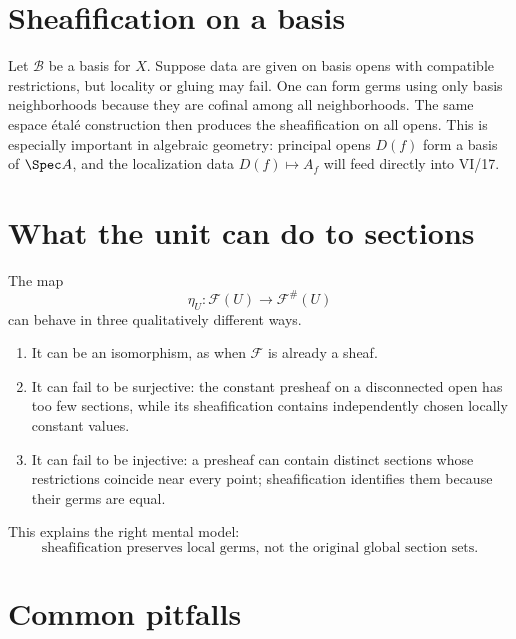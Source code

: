 

\section{Sheafification on a basis}

Let $\mathcal B$ be a basis for $X$.  Suppose data are given on basis opens with compatible
restrictions, but locality or gluing may fail.  One can form germs using only basis
neighborhoods because they are cofinal among all neighborhoods.  The same espace
\'{e}tal\'{e} construction then produces the sheafification on all opens.  This is especially
important in algebraic geometry: principal opens $D(f)$ form a basis of $\Spec A$, and the
localization data $D(f)\mapsto A_f$ will feed directly into VI/17.

\section{What the unit can do to sections}

The map
\[
\eta_U:\mathcal F(U)\to\mathcal F^\#(U)
\]
can behave in three qualitatively different ways.
\begin{enumerate}
\item It can be an isomorphism, as when $\mathcal F$ is already a sheaf.
\item It can fail to be surjective: the constant presheaf on a disconnected open has too few
sections, while its sheafification contains independently chosen locally constant values.
\item It can fail to be injective: a presheaf can contain distinct sections whose restrictions
coincide near every point; sheafification identifies them because their germs are equal.
\end{enumerate}



This explains the right mental model:
\[
\boxed{\text{sheafification preserves local germs, not the original global section sets}.}
\]

\section{Common pitfalls}


